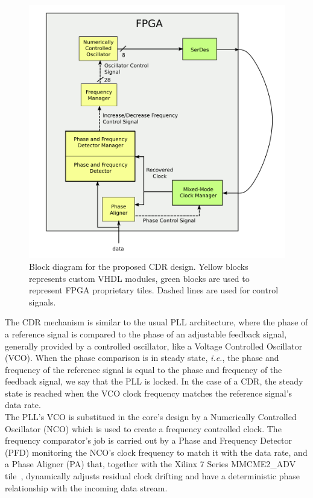 \documentclass[11pt]{article}
\renewcommand{\>}{\rangle} \renewcommand{\emptyset}{\varnothing}
\begin{document}
\begin{figure}[h]
  \centerline{\includegraphics[width=0.5\linewidth]{images/block}}
  \caption{Block diagram for the proposed CDR design. Yellow blocks represents
    custom VHDL modules, green blocks are used to represent FPGA proprietary
    tiles. Dashed lines are used for control signals.}
  \label{fig:cdr_overview}
\end{figure}

The CDR mechanism is similar to the usual PLL architecture, where the phase of a
reference signal is compared to the phase of an adjustable feedback signal,
generally provided by a controlled oscillator, like a Voltage Controlled
Oscillator (VCO). When the phase comparison is in steady state, \textit{i.e.},
the phase and frequency of the reference signal is equal to the phase and
frequency of the feedback signal, we say that the PLL is locked. In the case of
a CDR, the steady state is reached when the VCO clock frequency
matches the reference signal's data rate.\\
The PLL's VCO is substitued in the core's design by a Numerically Controlled
Oscillator (NCO) which is used to create a frequency controlled clock. The
frequency comparator's job is carried out by a Phase and Frequency Detector
(PFD) monitoring the NCO's clock frequency to match it with the data rate, and a
Phase Aligner (PA) that, together with the Xilinx 7 Series MMCME2\_ADV
tile~\cite{ref:mmcm}, dynamically adjusts residual clock drifting and have a
deterministic phase
relationship with the incoming data stream.\\
\end{document}

